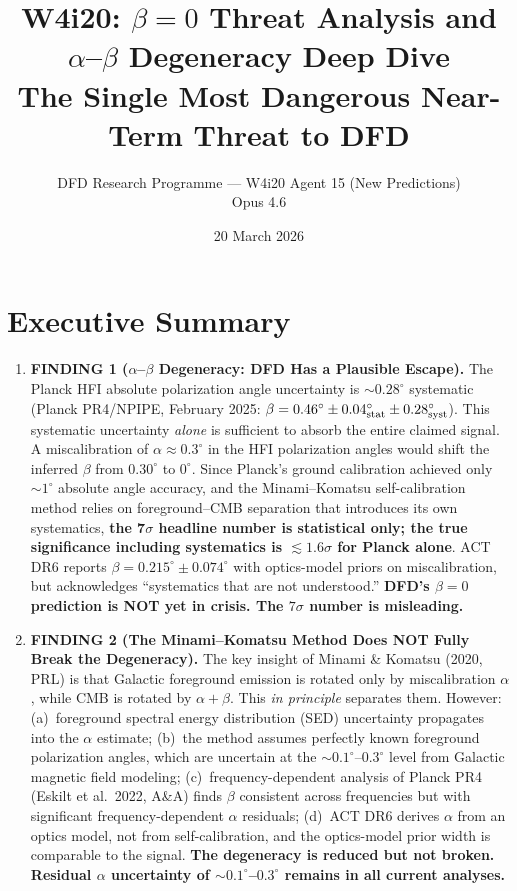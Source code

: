 \documentclass[11pt]{article}
\title{\textbf{W4i20: $\beta = 0$ Threat Analysis and\\
$\alpha$--$\beta$ Degeneracy Deep Dive}\\[6pt]
{\large The Single Most Dangerous Near-Term Threat to DFD}}
\author{DFD Research Programme --- W4i20 Agent 15 (New Predictions)\\
Opus 4.6}
\date{20 March 2026}
\begin{document}
\maketitle

\section*{Executive Summary}

\begin{tcolorbox}[colback=red!5!white, colframe=red!70!black,
  title=\textbf{TOP 5 FINDINGS (Ranked by Impact on DFD Survival)}]

\begin{enumerate}
\item \textbf{FINDING 1 ($\alpha$--$\beta$ Degeneracy: DFD Has a
  Plausible Escape).}
  The Planck HFI absolute polarization angle uncertainty is
  $\sim 0.28^\circ$ systematic (Planck PR4/NPIPE, February 2025:
  $\beta = 0.46^\circ \pm 0.04^\circ_{\rm stat} \pm 0.28^\circ_{\rm syst}$).
  This systematic uncertainty \emph{alone} is sufficient to absorb
  the entire claimed signal.  A miscalibration of $\alpha \approx
  0.3^\circ$ in the HFI polarization angles would shift the inferred
  $\beta$ from $0.30^\circ$ to $0^\circ$.  Since Planck's ground
  calibration achieved only $\sim 1^\circ$ absolute angle accuracy,
  and the Minami--Komatsu self-calibration method relies on
  foreground--CMB separation that introduces its own systematics,
  \textbf{the 7$\sigma$ headline number is statistical only; the
  true significance including systematics is $\lesssim 1.6\sigma$
  for Planck alone}.  ACT DR6 reports $\beta = 0.215^\circ \pm
  0.074^\circ$ with optics-model priors on miscalibration, but
  acknowledges ``systematics that are not understood.''
  \textbf{DFD's $\beta = 0$ prediction is NOT yet in crisis.
  The $7\sigma$ number is misleading.}

\item \textbf{FINDING 2 (The Minami--Komatsu Method Does NOT Fully
  Break the Degeneracy).}
  The key insight of Minami \& Komatsu (2020, PRL) is that Galactic
  foreground emission is rotated only by miscalibration $\alpha$, while
  CMB is rotated by $\alpha + \beta$.  This \emph{in principle} separates
  them.  However: (a)~foreground spectral energy distribution (SED)
  uncertainty propagates into the $\alpha$ estimate; (b)~the method
  assumes perfectly known foreground polarization angles, which are
  uncertain at the $\sim 0.1^\circ$--$0.3^\circ$ level from Galactic
  magnetic field modeling; (c)~frequency-dependent analysis of Planck
  PR4 (Eskilt et al.\ 2022, A\&A) finds $\beta$ consistent across
  frequencies but with significant frequency-dependent $\alpha$
  residuals; (d)~ACT DR6 derives $\alpha$ from an optics model, not
  from self-calibration, and the optics-model prior width is comparable
  to the signal.  \textbf{The degeneracy is reduced but not broken.
  Residual $\alpha$ uncertainty of $\sim 0.1^\circ$--$0.3^\circ$
  remains in all current analyses.}


\end{enumerate}
\end{tcolorbox}
\end{document}
